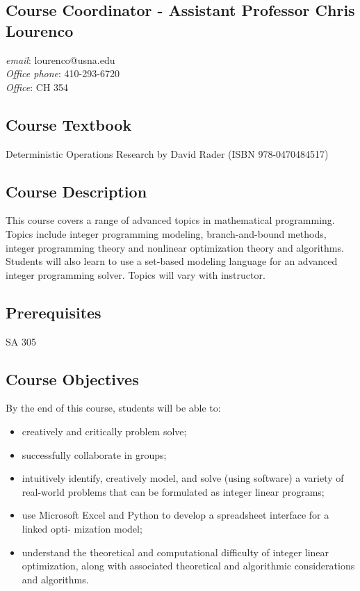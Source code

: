 \documentclass[letterpaper,hidelinks,oneside,11pt]{article}%
\begin{document}
\noindent{}
\subsection*{Course Coordinator - Assistant Professor Chris Lourenco} 
\textit{email}: lourenco@usna.edu \\
\textit{Office phone}: 410-293-6720 \\
\textit{Office}: CH 354


\subsection*{Course Textbook}
Deterministic Operations Research by David Rader (ISBN  978-0470484517)


\subsection*{Course Description}

This course covers a range of advanced topics in mathematical programming. Topics include integer programming modeling, branch-and-bound methods, integer programming theory and nonlinear optimization theory and algorithms. Students will also learn to use a set-based modeling language for an advanced integer programming solver. Topics will vary with instructor.

\subsection*{Prerequisites}

SA 305

\subsection*{Course Objectives}

By the end of this course, students will be able to:
\begin{itemize}
\item creatively and critically problem solve;
\item successfully collaborate in groups;
\item intuitively identify, creatively model, and solve (using software) a variety of real-world
problems that can be formulated as integer linear programs;
\item use Microsoft Excel and Python to develop a spreadsheet interface for a linked opti-
mization model;
\item understand the theoretical and computational difficulty of integer linear optimization,
along with associated theoretical and algorithmic considerations and algorithms.
\end{itemize}
\end{document}
